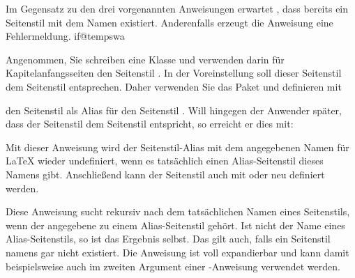 Im Gegensatz zu den drei vorgenannten Anweisungen erwartet
, dass bereits ein Seitenstil mit dem Namen
 existiert. Anderenfalls erzeugt die Anweisung
eine Fehlermeldung.
%
\csname if@tempswa\endcsname%
\begin{Example}
  Angenommen, Sie schreiben eine Klasse und verwenden darin für
  Kapitelanfangsseiten den Seitenstil . In der
  Voreinstellung soll dieser Seitenstil dem Seitenstil 
  entsprechen. Daher verwenden Sie das Paket  und definieren
  mit
\begin{lstcode}
\end{lstcode}
  den Seitenstil  als Alias für den Seitenstil
  . Will hingegen der Anwender später, dass der Seitenstil
   dem Seitenstil  entspricht, so erreicht
  er dies mit:
\begin{lstcode}
\end{lstcode}%
\end{Example}%
\fi
\EndIndexGroup


\begin{Declaration}
\end{Declaration}
%
%
Mit dieser Anweisung wird der Seitenstil-Alias mit dem angegebenen Namen
 für \LaTeX{} wieder undefiniert, wenn es
tatsächlich einen Alias-Seitenstil dieses Namens gibt. Anschließend kann der
Seitenstil auch mit  oder
 neu definiert werden.%
\iffalse %
\par
Die Anweisung ist dazu bestimmt, innerhalb des Arguments \PName{Code} von
\DescRef{\LabelBase.cmd.scrlayerOnAutoRemoveInterface} (siehe
\autoref{sec:scrlayer.enduserinterfaces},
\DescPageRef{scrlayer.cmd.scrlayerOnAutoRemoveInterface}) verwendet zu
werden, um Seitenstile, die als Teil eines Endanwender-Interfaces definiert
wurden, beim automatischen Entfernen dieses Interfaces mit zu entfernen.%
\fi%
\EndIndexGroup


\begin{Declaration}
\end{Declaration}
%
%
Diese Anweisung sucht rekursiv nach dem tatsächlichen Namen eines
Seitenstils, wenn der angegebene  zu einem
Alias-Seitenstil gehört. Ist  nicht der Name eines
Alias-Seitenstils, so ist das Ergebnis  selbst. Das
gilt auch, falls ein Seitenstil namens  gar nicht
existiert. Die Anweisung ist voll expandierbar und kann damit beispielsweise
auch im zweiten Argument einer -Anweisung verwendet werden.%
\EndIndexGroup



